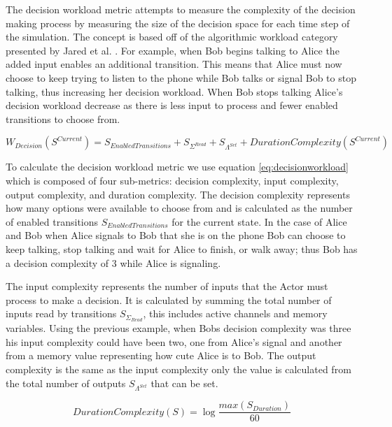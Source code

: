 The decision workload metric attempts to measure the complexity of the decision making process by measuring the size of the decision space for each time step of the simulation.  The concept is based off of the algorithmic workload category presented by Jared et al. \cite{moore2014modeling}.  For example, when Bob begins talking to Alice the added input enables an additional transition.  This means that Alice must now choose to keep trying to listen to the phone while Bob talks or signal Bob to stop talking, thus increasing her decision workload.  When Bob stops talking Alice's decision workload decrease as there is less input to process and fewer enabled transitions to choose from.

\begin{equation}
  W_{Decision}(S^{Current}) = S_{EnabledTransitions} + S_{\Sigma^{Read}} + S_{\Lambda^{Set}} + DurationComplexity(S^{Current})
  \label{eq:decisionworkload}
\end{equation}

To calculate the decision workload metric we use equation \ref{eq:decisionworkload} which is composed of four sub-metrics: decision complexity, input complexity, output complexity, and duration complexity.  The decision complexity represents how many options were available to choose from and is calculated as the number of enabled transitions $S_{EnabledTransitions}$ for the current state.  In the case of Alice and Bob when Alice signals to Bob that she is on the phone Bob can choose to keep talking, stop talking and wait for Alice to finish, or walk away; thus Bob has a decision complexity of 3 while Alice is signaling.  

The input complexity represents the number of inputs that the Actor must process to make a decision.  It is calculated by summing the total number of inputs read by transitions $S_{\Sigma_{Read}}$, this includes active channels and memory variables.  Using the previous example, when Bobs decision complexity was three his input complexity could have been two, one from Alice's signal and another from a memory value representing how cute Alice is to Bob.  The output complexity is the same as the input complexity only the value is calculated from the total number of outputs $S_{\Lambda^{Set}}$ that can be set.

\begin{equation}
  DurationComplexity(S) = \log \frac{max(S_{Duration})}{60}
  \label{eq:duration_complexity}
\end{equation}

